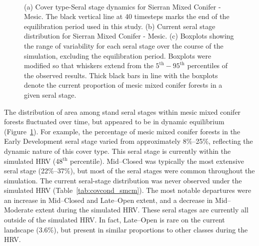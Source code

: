 \begin{figure}[!htbp]
  \centering
   \\
  \caption{(a) Cover type-Seral stage dynamics for Sierran Mixed Conifer - Mesic. The black vertical line at 40 timesteps marks the end of the equilibration period used in this study. (b) Current seral stage distribution for Sierran Mixed Conifer - Mesic. (c) Boxplots showing the range of variability for each seral stage over the course of the simulation, excluding the equilibration period. Boxplots were modified so that whiskers extend from the $5^{\text{th}} - 95^{\text{th}}$ percentiles of the observed results. Thick black bars in line with the boxplots denote the current proportion of mesic mixed conifer forests in a given seral stage.} 
  \label{fig:hrv-covcond_smcm}
\end{figure}

The distribution of area among stand seral stages within mesic mixed conifer forests fluctuated over time, but appeared to be in dynamic equilibrium (Figure~\ref{fig:hrv-covcond_smcm}). For example, the percentage of mesic mixed conifer forests in the Early Development seral stage varied from approximately 8\%--25\%, reflecting the dynamic nature of this cover type. This seral stage is currently within the simulated HRV (48$^{\text{th}}$ percentile). Mid--Closed was typically the most extensive seral stage (22\%--37\%), but most of the seral stages were common throughout the simulation. %
The current seral-stage distribution was never observed under the simulated HRV (Table~\ref{tab:covcond_smcm}). The most notable departures were an increase in Mid--Closed and Late--Open extent, and a decrease in Mid--Moderate extent during the simulated HRV. These seral stages are currently all outside of the simulated HRV. In fact, Late--Open is rare on the current landscape (3.6\%), but present in similar proportions to  other classes during the HRV. 


